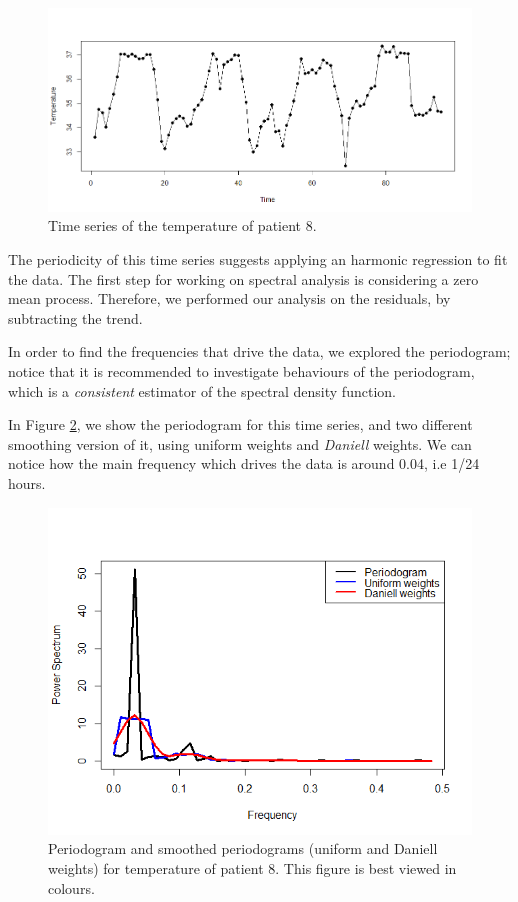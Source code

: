 \documentclass[]{article}
\begin{document}
\begin{figure}[ht]\centering
	\includegraphics[scale = 0.3]{Temp8.png}
	\caption{Time series of the temperature of patient 8.}
	\label{fig:Temp8}
\end{figure}

The periodicity of this time series suggests applying an harmonic regression to fit the data. The first step for working on spectral analysis is considering a zero mean process. Therefore, we performed our analysis on the residuals, by subtracting the trend. 

In order to find the frequencies that drive the data, we explored the periodogram; notice that it is recommended to investigate behaviours of the  periodogram, which is a \textit{consistent} estimator of the spectral density function. 

In Figure \ref{fig:period_Temp8}, we show the periodogram for this time series, and two different smoothing version of it, using uniform weights and \textit{Daniell} weights. We can notice how the main frequency which drives the data is around 0.04, i.e 1/24 hours.

\begin{figure}[htbp]\centering
	\includegraphics[scale = 0.4]{Temp8_Periodograms.png}
	\caption{Periodogram and smoothed periodograms (uniform and Daniell weights) for temperature of patient 8. This figure is best viewed in colours.}
	\label{fig:period_Temp8}
\end{figure}
\end{document}

